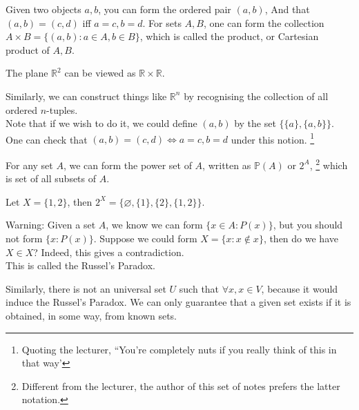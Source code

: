 \begin{definition}
    Given two objects $a,b$, you can form the ordered pair $(a,b)$,
    And that $(a,b)=(c,d)$ iff $a=c,b=d$.
    For sets $A,B$, one can form the collection $A\times B=\{(a,b):a\in A,b\in B\}$, which is called the product, or Cartesian product of $A,B$.
\end{definition}
\begin{example}
    The plane $\mathbb R^2$ can be viewed as $\mathbb R\times\mathbb R$.
\end{example}
Similarly, we can construct things like $\mathbb R^n$ by recognising the collection of all ordered $n$-tuples.\\
Note that if we wish to do it, we could define $(a,b)$ by the set $\{\{a\},\{a,b\}\}$.
One can check that $(a,b)=(c,d)\iff a=c,b=d$ under this notion.
\footnote{Quoting the lecturer, ``You're completely nuts if you really think of this in that way'}
\begin{definition}
    For any set $A$, we can form the power set of $A$, written as $\mathbb P(A)$ or $2^A$,
    \footnote{Different from the lecturer, the author of this set of notes prefers the latter notation.}
    which is set of all subsets of $A$.
\end{definition}
\begin{example}
    Let $X=\{1,2\}$, then $2^X=\{\varnothing, \{1\},\{2\},\{1,2\}\}$.
\end{example}
\begin{remark}
    Warning: Given a set $A$, we know we can form $\{x\in A:P(x)\}$, but you should not form $\{x:P(x)\}$.
    Suppose we could form $X=\{x:x\notin x\}$, then do we have $X\in X$?
    Indeed, this gives a contradiction.\\
    This is called the Russel's Paradox.
\end{remark}
Similarly, there is not an universal set $U$ such that $\forall x,x\in V$, because it would induce the Russel's Paradox.
We can only guarantee that a given set exists if it is obtained, in some way, from known sets.
